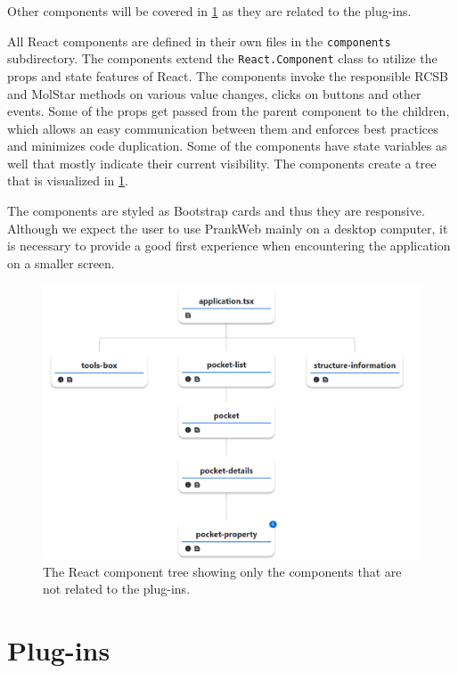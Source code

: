 Other components will be covered in \cref{sec:plugins} as they are related to the plug-ins.

All React components are defined in their own files in the \texttt{components} subdirectory. The components extend the \texttt{React.Component} class to utilize the props and state features of React. The components invoke the responsible RCSB and MolStar methods on various value changes, clicks on buttons and other events. Some of the props get passed from the parent component to the children, which allows an easy communication between them and enforces best practices and minimizes code duplication. Some of the components have state variables as well that mostly indicate their current visibility. The components create a tree that is visualized in \cref{fig:react-molstar}.

The components are styled as Bootstrap cards and thus they are responsive. Although we expect the user to use PrankWeb mainly on a desktop computer, it is necessary to provide a good first experience when encountering the application on a smaller screen.


\begin{figure}[htb]
    \centering
    \includegraphics[width=\textwidth]{img/react_molstar.pdf}
    \caption{The React component tree showing only the components that are not related to the plug-ins.}
    \label{fig:react-molstar}
\end{figure}

\section{Plug-ins}
\label{sec:plugins}

